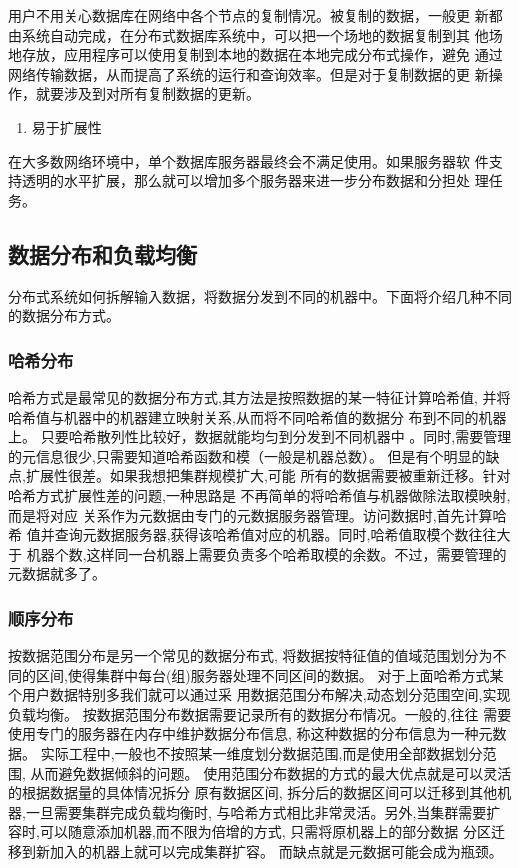 	用户不用关心数据库在网络中各个节点的复制情况。被复制的数据，一般更
	新都由系统自动完成，在分布式数据库系统中，可以把一个场地的数据复制到其
	他场地存放，应用程序可以使用复制到本地的数据在本地完成分布式操作，避免
	通过网络传输数据，从而提高了系统的运行和查询效率。但是对于复制数据的更
	新操作，就要涉及到对所有复制数据的更新。

	\begin{enumerate}[resume]
		\item 易于扩展性
	\end{enumerate}

	在大多数网络环境中，单个数据库服务器最终会不满足使用。如果服务器软
	件支持透明的水平扩展，那么就可以增加多个服务器来进一步分布数据和分担处
	理任务。
\subsection{数据分布和负载均衡}
分布式系统如何拆解输入数据，将数据分发到不同的机器中。下面将介绍几种不同的数据分布方式。 
\subsubsection{哈希分布}
哈希方式是最常见的数据分布方式,其方法是按照数据的某一特征计算哈希值,
并将哈希值与机器中的机器建立映射关系,从而将不同哈希值的数据分
布到不同的机器上。
只要哈希散列性比较好，数据就能均匀到分发到不同机器中
。同时,需要管理的元信息很少,只需要知道哈希函数和模（一般是机器总数）。 
但是有个明显的缺点,扩展性很差。如果我想把集群规模扩大,可能
所有的数据需要被重新迁移。针对哈希方式扩展性差的问题,一种思路是
不再简单的将哈希值与机器做除法取模映射,而是将对应
关系作为元数据由专门的元数据服务器管理。访问数据时,首先计算哈希
值并查询元数据服务器,获得该哈希值对应的机器。同时,哈希值取模个数往往大于
机器个数,这样同一台机器上需要负责多个哈希取模的余数。不过，需要管理的元数据就多了。 
\subsubsection{顺序分布}
按数据范围分布是另一个常见的数据分布式,
将数据按特征值的值域范围划分为不同的区间,使得集群中每台(组)服务器处理不同区间的数据。
对于上面哈希方式某个用户数据特别多我们就可以通过采
用数据范围分布解决,动态划分范围空间,实现负载均衡。 
按数据范围分布数据需要记录所有的数据分布情况。一般的,往往
需要使用专门的服务器在内存中维护数据分布信息, 称这种数据的分布信息为一种元数据。 
实际工程中,一般也不按照某一维度划分数据范围,而是使用全部数据划分范围,
从而避免数据倾斜的问题。 
使用范围分布数据的方式的最大优点就是可以灵活的根据数据量的具体情况拆分
原有数据区间, 拆分后的数据区间可以迁移到其他机器,一旦需要集群完成负载均衡时,
与哈希方式相比非常灵活。另外,当集群需要扩容时,可以随意添加机器,而不限为倍增的方式,
只需将原机器上的部分数据 分区迁移到新加入的机器上就可以完成集群扩容。
而缺点就是元数据可能会成为瓶颈。 
